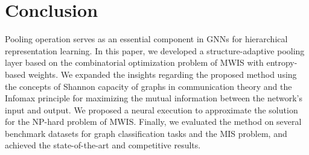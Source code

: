 \documentclass{article}
\begin{document}
\section{Conclusion}
\label{sec:conc}

Pooling operation serves as an essential component in GNNs for hierarchical representation learning. In this paper, we developed a structure-adaptive pooling layer based on the combinatorial optimization problem of MWIS with entropy-based weights. We expanded the insights regarding the proposed method using the concepts of Shannon capacity of graphs in communication theory and the Infomax principle for maximizing the mutual information between the network's input and output. We proposed a neural execution to approximate the solution for the NP-hard problem of MWIS. Finally, we evaluated the method on several benchmark datasets for graph classification tasks and the MIS problem, and achieved the state-of-the-art and competitive results.
\end{document}
